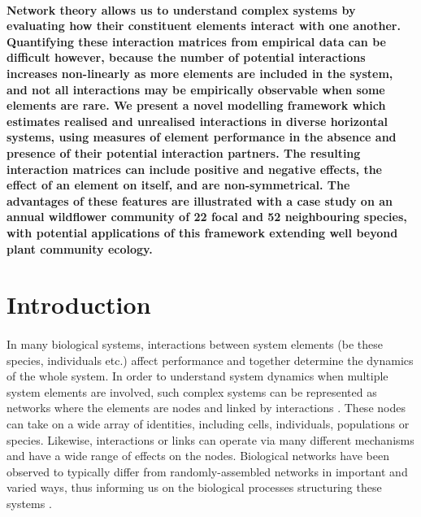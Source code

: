 \documentclass[a4,12pt]{article}
\begin{document}
    \paragraph{}
    \textbf{Network theory allows us to understand complex systems by evaluating how their constituent elements interact with one another. Quantifying these interaction matrices from empirical data can be difficult however, because the number of potential interactions increases non-linearly as more elements are included in the system, and not all interactions may be empirically observable when some elements are rare. We present a novel modelling framework which estimates realised and unrealised interactions in diverse horizontal systems, using measures of element performance in the absence and presence of their potential interaction partners. The resulting interaction matrices can include positive and negative effects, the effect of an element on itself, and are non-symmetrical. The advantages of these features are illustrated with a case study on an annual wildflower community of 22 focal and 52 neighbouring species, with potential applications of this framework extending well beyond plant community ecology.}



\section{Introduction}

    
    \paragraph{}
    In many biological systems, interactions between system elements (be these species, individuals etc.) affect performance and together determine the dynamics of the whole system. In order to understand system dynamics when multiple system elements are involved, such complex systems can be represented as networks where the elements are nodes and linked by interactions \parencite{Pimm1978}. These nodes can take on a wide array of identities, including cells, individuals, populations or species. Likewise, interactions or links can operate via many different mechanisms and have a wide range of effects on the nodes. Biological networks have been observed to typically differ from randomly-assembled networks in important and varied ways, thus informing us on the biological processes structuring these systems \parencite{Dunne2002, Kinlock2019}.
\end{document}
